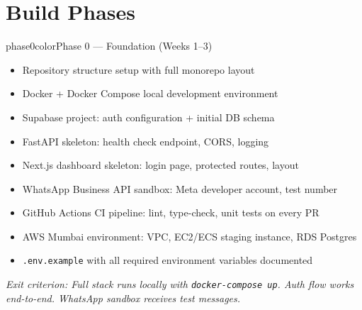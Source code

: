 \documentclass[12pt, a4paper]{article}
\begin{document}
\newpage

\section{Build Phases}

\begin{phasebox}{phase0color}{Phase 0 --- Foundation \quad (Weeks 1--3)}
\begin{itemize}[leftmargin=1.2em, itemsep=0.15em]
    \item Repository structure setup with full monorepo layout
    \item Docker + Docker Compose local development environment
    \item Supabase project: auth configuration + initial DB schema
    \item FastAPI skeleton: health check endpoint, CORS, logging
    \item Next.js dashboard skeleton: login page, protected routes, layout
    \item WhatsApp Business API sandbox: Meta developer account, test number
    \item GitHub Actions CI pipeline: lint, type-check, unit tests on every PR
    \item AWS Mumbai environment: VPC, EC2/ECS staging instance, RDS Postgres
    \item \texttt{.env.example} with all required environment variables documented
\end{itemize}
\textit{Exit criterion: Full stack runs locally with \texttt{docker-compose up}. Auth flow works end-to-end. WhatsApp sandbox receives test messages.}
\end{phasebox}

\vspace{0.5em}
\end{document}
